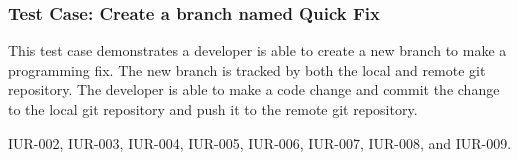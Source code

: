 \subsubsection{Test Case: Create a branch named Quick Fix}
\begin{description}[align=right,leftmargin=3.2cm,labelindent=3.0cm]
\item[Purpose:] This test case demonstrates a developer is able to create a new branch to make a programming fix.  The new branch is tracked by both the local and remote git repository.  The developer is able to make a code change and commit the change to the local git repository and push it to the remote git repository.
\item[Requirement:] IUR-002, IUR-003, IUR-004, IUR-005, IUR-006, IUR-007, IUR-008, and IUR-009.
\end{description}
